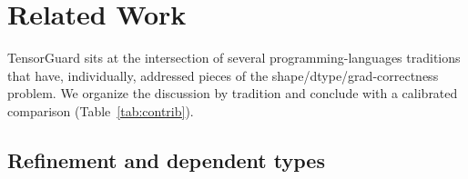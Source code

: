 
\section{Related Work}
\label{sec:related}

TensorGuard sits at the intersection of several programming-languages
traditions that have, individually, addressed pieces of the
shape/dtype/grad-correctness problem. We organize the discussion by
tradition and conclude with a calibrated comparison
(Table~\ref{tab:contrib}).

\subsection{Refinement and dependent types}

